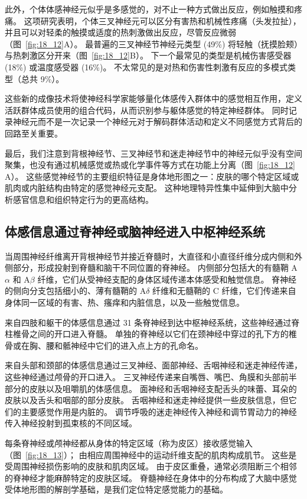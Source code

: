 此外，个体体感神经元似乎是多感觉的，对不止一种方式做出反应，例如触摸和疼痛。
这项研究表明，个体三叉神经元可以区分有害热和机械性疼痛（头发拉扯），并且可以对轻柔的触摸或适度的热刺激做出反应，尽管反应微弱（图~\ref{fig:18_12}A）。
最普遍的三叉神经节神经元类型 (49\%) 将轻触（抚摸脸颊）与热刺激区分开来（图~\ref{fig:18_12}B）。 
下一个最常见的类型是机械伤害感受器 (18\%) 或温度感受器 (16\%)。
不太常见的是对热和伤害性刺激有反应的多模式类型（总共 9\%）。


这些新的成像技术将使神经科学家能够量化体感传入群体中的感觉相互作用，定义活跃群体成员使用的组合代码，从而识别参与躯体感觉的特定神经群体。
同时记录神经元而不是一次记录一个神经元对于解码群体活动和定义不同感觉方式背后的回路至关重要。


最后，我们注意到背根神经节、三叉神经节和迷走神经节中的神经元似乎没有空间聚集，也没有通过机械感觉或热或化学事件等方式在功能上分离（图~\ref{fig:18_12} A）。
这些感觉神经节的主要组织特征是身体地形图之一：皮肤的哪个特定区域或肌肉或内脏结构由特定的感觉神经元支配。
这种地理特异性集中延伸到大脑中分析感官信息和组织特定行为的更高结构。



\subsection{体感信息通过脊神经或脑神经进入中枢神经系统}

当周围神经纤维离开背根神经节并接近脊髓时，大直径和小直径纤维分成内侧和外侧部分，形成投射到脊髓和脑干不同位置的脊神经。
内侧部分包括大的有髓鞘 A$\alpha$ 和 A$\beta$ 纤维，它们从受神经支配的身体区域传递本体感受和触觉信息。
脊神经的侧向分支包括细小的、薄有髓鞘的 A$\delta$ 纤维和无髓鞘的 C 纤维，它们传递来自身体同一区域的有害、热、瘙痒和内脏信息，以及一些触觉信息。


来自四肢和躯干的体感信息通过 31 条脊神经到达中枢神经系统，这些神经通过脊柱椎骨之间的开口进入脊髓。 
单独的脊神经以它们在颈神经中穿过的孔下方的椎骨或在胸、腰和骶神经中它们的进入点上方的孔命名。


来自头部和颈部的体感信息通过三叉神经、面部神经、舌咽神经和迷走神经传递，这些神经通过颅骨的开口进入。 
三叉神经传递来自嘴唇、嘴巴、角膜和头部前半部分的皮肤以及咀嚼肌的体感信息。
面神经和舌咽神经支配舌头的味蕾、耳朵的皮肤以及舌头和咽部的部分皮肤。
舌咽神经和迷走神经提供一些皮肤信息，但它们的主要感觉作用是内脏的。
调节呼吸的迷走神经传入神经和调节胃动力的神经传入神经投射到孤束核的不同区域。


每条脊神经或颅神经都从身体的特定区域（称为皮区）接收感觉输入（图~\ref{fig:18_13}）；
由相应周围神经中的运动纤维支配的肌肉构成肌节。
这些是受周围神经损伤影响的皮肤和肌肉区域。
由于皮区重叠，通常必须阻断三个相邻的脊神经才能麻醉特定的皮肤区域。
脊髓神经在身体中的分布构成了大脑中感觉受体地形图的解剖学基础，是我们定位特定感觉能力的基础。


